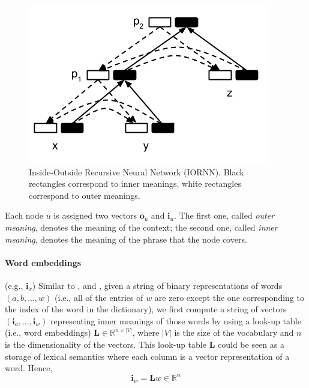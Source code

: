 \documentclass[11pt]{article}
\begin{document}
\begin{figure}[h!]
	\center
	\includegraphics[scale=0.5]{IORNN.png}
	\caption{Inside-Outside Recursive Neural Network (IORNN). 
	Black rectangles correspond to inner meanings, 
	white rectangles correspond to outer meanings.}
	\label{figure iornn}
\end{figure}


Each node $u$ is assigned two vectors $\mathbf{o}_u$ and $\mathbf{i}_u$. The first one,
called \textit{outer meaning}, denotes the meaning of the context; the second one, 
called \textit{inner meaning}, denotes the meaning of the phrase that the node covers.

\paragraph{Word embeddings} (e.g., $\mathbf{i}_x$)
Similar to \cite{socher_learning_2010}, and \cite{collobert_natural_2011}, given a string of binary
representations of words $(a, b, ..., w)$ (i.e., all of the entries of $w$ are zero except the one 
corresponding to the index of the word in the dictionary), 
we first compute a string of vectors $(\mathbf{i}_{a},...,\mathbf{i}_{w})$ 
representing inner meanings of those words by using 
a look-up table (i.e., word embeddings) $\mathbf{L} \in \mathbb{R}^{n \times |V|}$, 
where $|V|$ is the size of the vocabulary and $n$ is the dimensionality of the vectors. 
This look-up table $\mathbf{L}$ could be seen as a storage of lexical semantics where each column 
is a vector representation of a word. Hence, 
\begin{equation}
    \label{equation compute word vector}
    \mathbf{i}_{w} = \mathbf{L} w \in \mathbb{R}^n
\end{equation}
\end{document}
